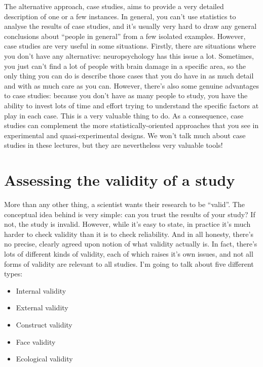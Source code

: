 The alternative approach, case studies, aims to provide a very detailed description of one or a few instances. In general, you can't use statistics to analyse the results of case studies, and it's usually very hard to draw any general conclusions about ``people in general'' from a few isolated examples. However, case studies are very useful in some situations. Firstly, there are situations where you don't have any alternative: neuropsychology has this issue a lot. Sometimes, you just can't find a lot of people with brain damage in a specific area, so the only thing you can do is describe those cases that you do have in as much detail and with as much care as you can. However, there's also some genuine advantages to case studies: because you don't have as many people to study, you have the ability to invest lots of time and effort trying to understand the specific factors at play in each case. This is a very valuable thing to do. As a consequence, case studies can complement the more statistically-oriented approaches that you see in experimental and quasi-experimental designs. We won't talk much about case studies in these lectures, but they are nevertheless very valuable tools!


\section{Assessing the validity of a study~\label{sec:validity}}

More than any other thing, a scientist wants their research to be ``valid''. The conceptual idea behind  is very simple: can you trust the results of your study? If not, the study is invalid. However, while it's easy to state, in practice it's much harder to check validity than it is to check reliability. And in all honesty, there's no precise, clearly agreed upon notion of what validity actually is. In fact, there's lots of different kinds of validity, each of which raises it's own issues, and not all forms of validity are relevant to all studies. I'm going to talk about five different types:

\begin{itemize} \itemsep -2pt
\item Internal validity
\item External validity
\item Construct validity
\item Face validity
\item Ecological validity
\end{itemize}

